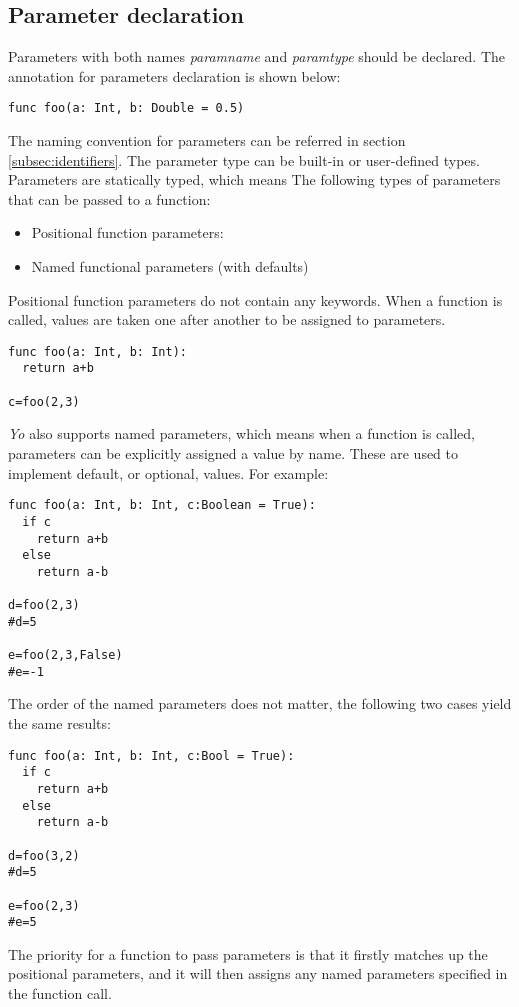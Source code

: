 \documentclass[12pt]{article}
\begin{document}
\subsection{Parameter declaration}
Parameters with both names \textit{paramname} and \textit{paramtype} should be declared. The annotation for parameters declaration is shown below:
\begin{lstlisting}[caption=Parameter declaration]
func foo(a: Int, b: Double = 0.5)
\end{lstlisting}
The naming convention for parameters can be referred in section \ref{subsec:identifiers}. The parameter type can be built-in or user-defined types.
Parameters are statically typed, which means 
The following types of parameters that can be passed to a function:
\begin{itemize}
  \item Positional function parameters: 
    \item Named functional parameters (with defaults)
\end{itemize}
Positional function parameters do not contain any keywords. When a function is called, values are taken one after another to be assigned to parameters.
\begin{lstlisting}[caption=Positional function parameters]
func foo(a: Int, b: Int):
  return a+b

c=foo(2,3)
\end{lstlisting}
\textit{Yo} also supports named parameters, which means when a function is called, parameters can be explicitly assigned a value by name. These are used to implement default, or optional, values. For example:
\begin{lstlisting}[caption=Named parameters]
func foo(a: Int, b: Int, c:Boolean = True):
  if c
    return a+b
  else
    return a-b

d=foo(2,3)
#d=5

e=foo(2,3,False)
#e=-1
\end{lstlisting}
The order of the named parameters does not matter, the following two cases yield the same results:
\begin{lstlisting}[caption=Non-ordered named parameters]
func foo(a: Int, b: Int, c:Bool = True):
  if c
    return a+b
  else
    return a-b

d=foo(3,2)
#d=5

e=foo(2,3)
#e=5
\end{lstlisting}
The priority for a function to pass parameters is that it firstly matches up the positional parameters, and it will then assigns any named parameters specified in the function call.
\end{document}
